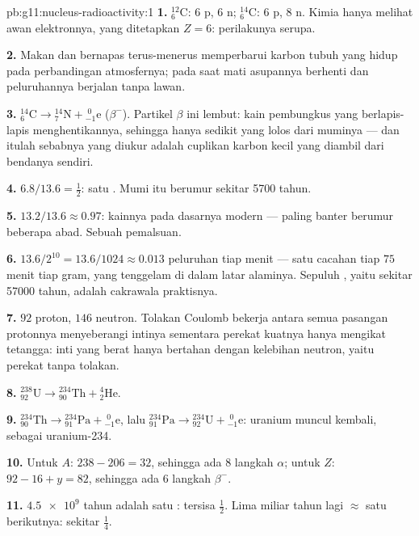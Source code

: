\begin{solution}{pb:g11:nucleus-radioactivity:1}
\textbf{1.} ${}^{12}_{6}\mathrm{C}$: $6$ p, $6$ n;
${}^{14}_{6}\mathrm{C}$: $6$ p, $8$ n. Kimia hanya melihat awan elektronnya,
yang ditetapkan $Z = 6$: perilakunya serupa.

\textbf{2.} Makan dan bernapas terus-menerus memperbarui karbon tubuh yang
hidup pada perbandingan atmosfernya; pada saat mati asupannya berhenti dan
peluruhannya berjalan tanpa lawan.

\textbf{3.} ${}^{14}_{6}\mathrm{C} \to {}^{14}_{7}\mathrm{N} +
{}^{\;0}_{-1}\mathrm{e}$ ($\beta^-$). Partikel $\beta$ ini lembut: kain
pembungkus yang berlapis-lapis menghentikannya, sehingga hanya sedikit yang
lolos dari muminya --- dan itulah sebabnya yang diukur adalah cuplikan
karbon kecil yang diambil dari bendanya sendiri.

\textbf{4.} $6.8/13.6 = \frac12$: satu . Mumi itu berumur
sekitar \num{5700} tahun.

\textbf{5.} $13.2/13.6 \approx 0.97$: kainnya pada dasarnya modern ---
paling banter berumur beberapa abad. Sebuah pemalsuan.

\textbf{6.} $13.6/2^{10} = 13.6/1024 \approx 0.013$ peluruhan tiap menit
--- satu cacahan tiap $75$ menit tiap gram, yang tenggelam di dalam latar
alaminya. Sepuluh , yaitu sekitar \num{57000} tahun, adalah
cakrawala praktisnya.

\textbf{7.} $92$ proton, $146$ neutron. Tolakan Coulomb bekerja antara
semua pasangan protonnya menyeberangi intinya sementara perekat kuatnya
hanya mengikat tetangga: inti yang berat hanya bertahan dengan kelebihan
neutron, yaitu perekat tanpa tolakan.

\textbf{8.} ${}^{238}_{92}\mathrm{U} \to {}^{234}_{90}\mathrm{Th} +
{}^{4}_{2}\mathrm{He}$.

\textbf{9.} ${}^{234}_{90}\mathrm{Th} \to {}^{234}_{91}\mathrm{Pa} +
{}^{\;0}_{-1}\mathrm{e}$, lalu ${}^{234}_{91}\mathrm{Pa} \to
{}^{234}_{92}\mathrm{U} + {}^{\;0}_{-1}\mathrm{e}$: uranium muncul kembali,
sebagai uranium-234.

\textbf{10.} Untuk $A$: $238 - 206 = 32$, sehingga ada $8$ langkah
$\alpha$; untuk $Z$: $92 - 16 + y = 82$, sehingga ada $6$ langkah
$\beta^-$.

\textbf{11.} $\num{4.5e9}$ tahun adalah satu : tersisa
$\frac12$. Lima miliar tahun lagi $\approx$ satu  berikutnya:
sekitar $\frac14$.


\end{solution}
